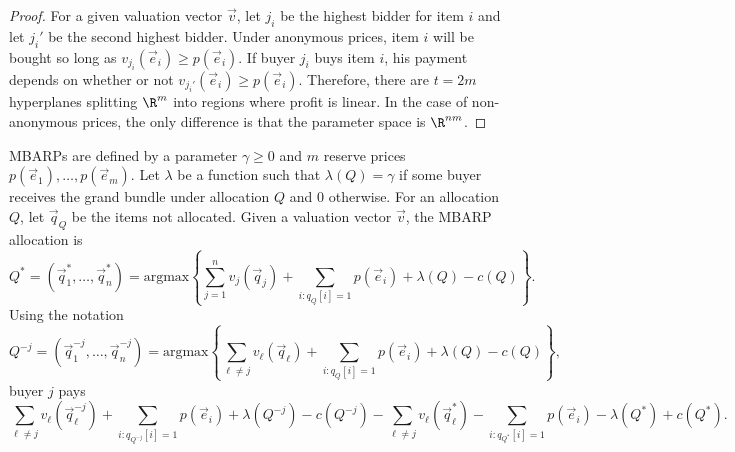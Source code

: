 \secondPrice*

\begin{proof}
For a given valuation vector $\vec{v}$, let $j_i$ be the highest bidder for item $i$ and let $j_i'$ be the second highest bidder.
Under anonymous prices, item $i$ will be bought so long as $v_{j_i}(\vec{e}_i) \geq p(\vec{e}_i)$. If buyer $j_i$ buys item $i$, his payment depends on whether or not $v_{j_i'}(\vec{e}_i) \geq p(\vec{e}_i)$. Therefore, there are $t = 2m$ hyperplanes splitting $\R^m$ into regions where profit is linear.
In the case of non-anonymous prices, the only difference is that the parameter space is $\R^{nm}$. 
\end{proof}


\begin{definition}\label{def:MBARP}
	MBARPs are defined by a parameter $\gamma \geq 0$ and $m$ reserve prices $p\left(\vec{e}_1\right), \dots, p\left(\vec{e}_m\right)$. Let $\lambda$ be a function such that $\lambda\left(Q\right) = \gamma$ if some buyer receives the grand bundle under allocation $Q$ and 0 otherwise. For an allocation $Q$, let $\vec{q}_Q$ be the items not allocated. Given a valuation vector $\vec{v}$, the MBARP allocation is \[Q^* = \left(\vec{q}_1^*, \dots, \vec{q}_n^*\right) = \text{argmax}\left\{\sum_{j = 1}^n v_j\left(\vec{q}_j\right) + \sum_{i : q_Q[i] = 1} p\left(\vec{e}_i\right) + \lambda\left(Q\right) - c\left(Q\right)\right\}.\] 
	Using the notation \[Q^{-j} = \left(\vec{q}_1^{-j}, \dots, \vec{q}_n^{-j}\right) = \text{argmax}\left\{ \sum_{\ell \not = j} v_\ell\left(\vec{q}_\ell\right) + \sum_{i : q_Q[i] = 1} p\left(\vec{e}_i\right) + \lambda\left(Q\right) - c\left(Q\right)\right\},\] buyer $j$ pays \[\sum_{\ell \not= j} v_\ell\left(\vec{q}_\ell^{-j}\right) + \sum_{i : q_{Q^{-j}}[i] = 1} p\left(\vec{e}_i\right) + \lambda\left(Q^{-j}\right) - c\left(Q^{-j}\right) - \sum_{\ell \not= j} v_\ell\left(\vec{q}^*_\ell\right) - \sum_{i : q_{Q^*}[i] = 1} p\left(\vec{e}_i\right) - \lambda\left(Q^*\right) + c\left(Q^*\right).\]
\end{definition}
 
 \MBARP*
 
